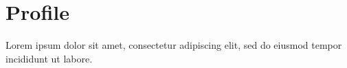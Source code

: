 \documentclass{vitae}
\begin{document}
\makemasthead
\section{Profile}
Lorem ipsum dolor sit amet, consectetur adipiscing elit,
sed do eiusmod tempor incididunt ut labore.
\end{document}
